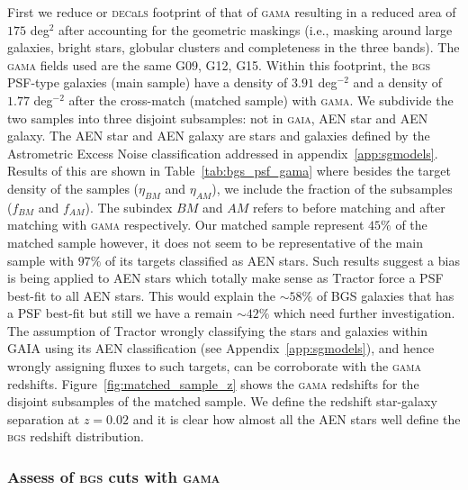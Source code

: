 \documentclass[fleqn,usenatbib]{mnras}
\newcommand{\BGS}{\textsc{bgs}\xspace}
\newcommand{\DECaLS}{\textsc{dec}a\textsc{ls}\xspace}
\newcommand{\GAMA}{\textsc{gama}\xspace}
\newcommand{\GAIA}{\textsc{gaia}\xspace}
\newcommand{\TRACTOR}{\textsc{T}ractor\xspace}
\begin{document}
First we reduce or \DECaLS footprint of that of \GAMA resulting in a reduced area of $175$ deg$^2$ after accounting for the geometric maskings (i.e., masking around large galaxies, bright stars, globular clusters and completeness in the three bands). The \GAMA fields used are the same G09, G12, G15. Within this footprint, the \BGS PSF-type galaxies (main sample) have a density of $3.91$ deg$^{-2}$ and a density of $1.77$ deg$^{-2}$ after the cross-match (matched sample) with \GAMA. We subdivide the two samples into three disjoint subsamples: not in \GAIA, AEN star and AEN galaxy. The AEN star and AEN galaxy are stars and galaxies defined by the Astrometric Excess Noise classification addressed in appendix~\ref{app:sgmodels}. Results of this are shown in Table~\ref{tab:bgs_psf_gama} where besides the target density of the samples ($\eta_{BM}$ and $\eta_{AM}$), we include the fraction of the subsamples ($f_{BM}$ and $f_{AM}$). The subindex $BM$ and $AM$ refers to before matching and after matching with \GAMA respectively. Our matched sample represent $45 \%$ of the matched sample however, it does not seem to be representative of the main sample with $97 \%$ of its targets classified as AEN stars. Such results suggest a bias is being applied to AEN stars which totally make sense as \TRACTOR force a PSF best-fit to all AEN stars. This would explain the $\sim 58 \%$ of BGS galaxies that has a PSF best-fit but still we have a remain $\sim 42 \%$ which need further investigation. The assumption of \TRACTOR wrongly classifying the stars and galaxies within GAIA using its AEN classification (see Appendix~\ref{app:sgmodels}), and hence wrongly assigning fluxes to such targets, can be corroborate with the \GAMA redshifts. Figure~\ref{fig:matched_sample_z} shows the \GAMA redshifts for the disjoint subsamples of the matched sample. We define the redshift star-galaxy separation at $z=0.02$ \citep{add cite...} and it is clear how almost all the AEN stars well define the \BGS redshift distribution. 

\subsubsection{Assess of \BGS cuts with \GAMA}
\end{document}
